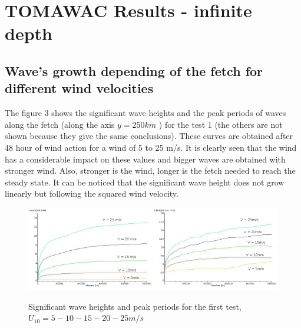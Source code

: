 \documentclass[10pt]{article}
\begin{document}
\section{TOMAWAC Results - infinite depth }
\subsection{Wave's growth depending of the fetch for different wind velocities}
The figure 3 shows the significant wave heights and the peak periods of waves along the fetch (along the axis $ y = 250 km$ ) for the test 1 (the others are not shown because they give the same conclusions). These curves are obtained after 48 hour of wind action for a wind of 5 to 25 m/s. It is clearly seen that the wind has a considerable impact on these values and bigger waves are obtained with stronger wind. Also, stronger is the wind, longer is the fetch needed to reach the steady state. It can be noticed that the significant wave height does not grow linearly but following the squared wind velocity.
\begin{figure}[H]
  \centering
  	\includegraphics[width=0.5\textwidth]{Hm0_free_mesh.jpg}\includegraphics[width=0.5\textwidth]{Tp_free_mesh.jpg}
      \caption{Significant wave heights and peak periods for the first test, $U_{10} = 5 - 10 - 15 - 20 - 25 m/s$}
\end{figure}
\end{document}
